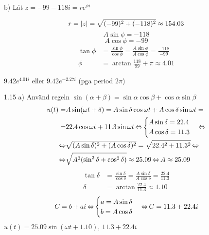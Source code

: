 \begin{task}{b)}
	Låt $z=-99-118i=re^{\phi i}$
	
	\[r=\left|z\right|=\sqrt{(-99)^2+(-118)^2}\approx154.03\]
	\[A\sin\phi=-118\]
	\[A\cos\phi=-99\]
	\begin{align*}
	\tan\phi&=
	\frac{\sin\phi}{\cos\phi}=
	\frac{A\sin\phi}{A\cos\phi}=
	\frac{-118}{-99} \\
	\phi&=
	\arctan\frac{118}{99}+\pi\approx 
	4.01
	\end{align*}
	
	\ans $9.42e^{4.01i}$ eller $9.42e^{-2.27i}$ (pga period $2\pi$)
\end{task}

\begin{task}{1.15 a)}
	Använd regeln $\sin(\alpha+\beta)=\sin\alpha\cos\beta+\cos\alpha\sin\beta$
	\begin{align*}
		u(t)=
		&A\sin(\omega t + \delta)=
		A\sin\delta\cos\omega t + A\cos\delta\sin\omega t= \\ =
		&22.4\cos\omega t + 11.3\sin\omega t \operatorname{\Leftrightarrow}
		\begin{cases}
		A\sin\delta = 22.4 \\
		A\cos\delta = 11.3
		\end{cases} \operatorname{\Leftrightarrow} \\ \operatorname{\Leftrightarrow}
		&\sqrt{(A\sin\delta)^2+(A\cos\delta)^2}=\sqrt{22.4^2+11.3^2} \operatorname{\Leftrightarrow} \\ \operatorname{\Leftrightarrow}
		&\sqrt{A^2(\sin^2\delta+\cos^2\delta)}\approx 25.09 \operatorname{\Leftrightarrow}
		A\approx 25.09
	\end{align*}
	\begin{align*}
	\tan\delta&=
	\frac{\sin\delta}{\cos\delta}=
	\frac{A\sin\delta}{A\cos\delta}=
	\frac{22.4}{11.3} \\
	\delta&=
	\arctan\frac{22.4}{11.3}\approx 
	1.10
	\end{align*}
	\[C=b+ai \operatorname{\Leftrightarrow}
	\begin{cases}
	a = A\sin\delta \\
	b = A\cos\delta
	\end{cases} \operatorname{\Leftrightarrow}
	C= 11.3+22.4i\]
	\ans $u(t)=25.09\sin(\omega t + 1.10)$, $11.3+22.4i$
\end{task}